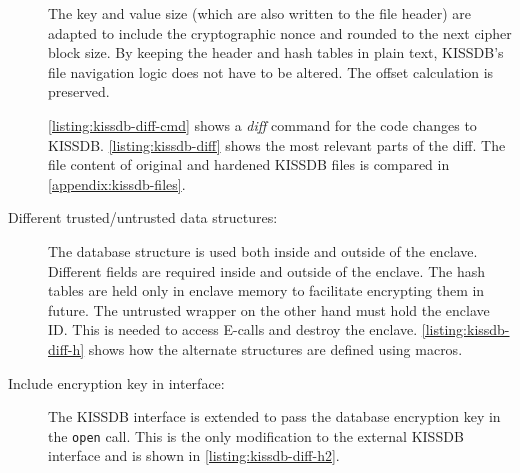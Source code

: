 \begin{description}
The key and value size (which are also written to the file header) are adapted to include the cryptographic nonce and rounded to the next cipher block size.\label{ID_1650391428}
By keeping the header and hash tables in plain text, KISSDB's file navigation logic does not have to be altered. The offset calculation is preserved.\label{ID_566758149}

\autoref{listing:kissdb-diff-cmd} shows a \textit{diff} command for the code changes to KISSDB.\label{ID_502276070}
\label{ID_1769253987}
\autoref{listing:kissdb-diff} shows the most relevant parts of the diff.\label{ID_1938960450}
\label{ID_1619361052}
The file content of original and hardened KISSDB files is compared in \autoref{appendix:kissdb-files}.\label{ID_941356556}
\item[Different trusted/untrusted data structures:]\label{ID_967763571}
The database structure is used both inside and outside of the enclave.\label{ID_1905540829}
Different fields are required inside and outside of the enclave.\label{ID_97536520}
The hash tables are held only in enclave memory to facilitate encrypting them in future.\label{ID_523563176}
The untrusted wrapper on the other hand must hold the enclave ID. This is needed to access E-calls and destroy the enclave.\label{ID_991688530}
\autoref{listing:kissdb-diff-h} shows how the alternate structures are defined using macros.\label{ID_51898782}
\label{ID_120974288}
\item[Include encryption key in interface:]\label{ID_313975582}
The KISSDB interface is extended to pass the database encryption key in the \texttt{open} call.\label{ID_916482321}
This is the only modification to the external KISSDB interface and is shown in \autoref{listing:kissdb-diff-h2}.\label{ID_1663963152}
\label{ID_607705448}


\end{description}
